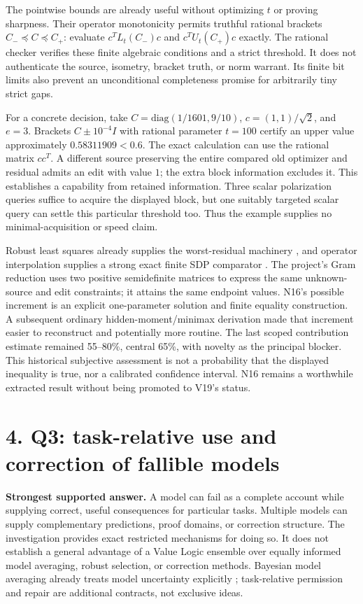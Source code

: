 \documentclass{article}
\theoremstyle{definition}
\begin{document}
The pointwise bounds are already useful without optimizing \(t\) or
proving sharpness. Their operator monotonicity permits truthful rational
brackets \(C_-\preceq C\preceq C_+\): evaluate \(c^TL_t(C_-)c\) and
\(c^TU_t(C_+)c\) exactly. The rational checker verifies these finite
algebraic conditions and a strict threshold. It does not authenticate
the source, isometry, bracket truth, or norm warrant. Its finite bit
limits also prevent an unconditional completeness promise for
arbitrarily tiny strict gaps.

For a concrete decision, take \(C=\mathrm{diag}(1/1601,9/10)\),
\(c=(1,1)/\sqrt2\), and \(e=3\). Brackets \(C\pm10^{-4}I\) with rational
parameter \(t=100\) certify an upper value approximately
\(0.58311909<0.6\). The exact calculation can use the rational matrix
\(cc^T\). A different source preserving the entire compared old
optimizer and residual admits an edit with value \(1\); the extra block
information excludes it. This establishes a capability from retained
information. Three scalar polarization queries suffice to acquire the
displayed block, but one suitably targeted scalar query can settle this
particular threshold too. Thus the example supplies no
minimal-acquisition or speed claim.

Robust least squares already supplies the worst-residual machinery
\citep{robustls}, and operator interpolation supplies a strong exact
finite SDP comparator \citep{operator}. The project's Gram reduction
uses two positive semidefinite matrices to express the same
unknown-source and edit constraints; it attains the same endpoint
values. N16's possible increment is an explicit one-parameter solution
and finite equality construction. A subsequent ordinary
hidden-moment/minimax derivation made that increment easier to
reconstruct and potentially more routine. The last scoped contribution
estimate remained 55--80\%, central 65\%, with novelty as the principal
blocker. This historical subjective assessment is not a probability that
the displayed inequality is true, nor a calibrated confidence interval.
N16 remains a worthwhile extracted result without being promoted to
V19's status.

\section{4. Q3: task-relative use and correction of fallible
models}\label{sec-q3}

\textbf{Strongest supported answer.} A model can fail as a complete
account while supplying correct, useful consequences for particular
tasks. Multiple models can supply complementary predictions, proof
domains, or correction structure. The investigation provides exact
restricted mechanisms for doing so. It does not establish a general
advantage of a Value Logic ensemble over equally informed model
averaging, robust selection, or correction methods. Bayesian model
averaging already treats model uncertainty explicitly \citep{bma};
task-relative permission and repair are additional contracts, not
exclusive ideas.
\end{document}
